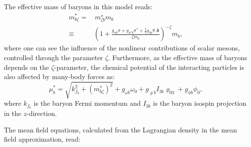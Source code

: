 \documentclass[twocolumn,showpacs,aps]{revtex4}
\begin{document}
The effective mass of baryons in this model reads:
\begin{equation}\begin{split}\label{meff_zen}
 m^*_{b \zeta}= & \, m_{\zeta b}^{\star} m_b \\
 \equiv& \left(1+\frac{g_{\sigma b}\sigma+g_{\sigma^* b}\sigma^* +\frac{1}{2}g_{\delta b}\boldsymbol{\tau.\delta}}{\zeta m_{b}}\right)^{-\zeta} m_b,
\end{split}\end{equation}
where one can see the influence of the nonlinear contributions of scalar mesons, controlled through the parameter $\zeta$.
Furthermore, as the effective mass of baryons depends on the $\zeta$-parameter, the chemical potential of
the interacting particles is also affected by many-body forces as:
\begin{equation}\label{mueff}
 \mu^*_{b}= \sqrt{k_{f_b}^2+(m_{b \zeta}^{*})^2} + g_{\omega b}\omega_0 + g_{\varrho b}I_{3 b} \varrho_{03} + g_{\phi b}\phi_0,
\end{equation}
where $k_{f_b}$ is the baryon Fermi momentum and $I_{3 b}$ is the baryon isospin projection in the $z$-direction.


The mean field equations, calculated from the Lagrangian density in the mean field approximation, read:
\end{document}

